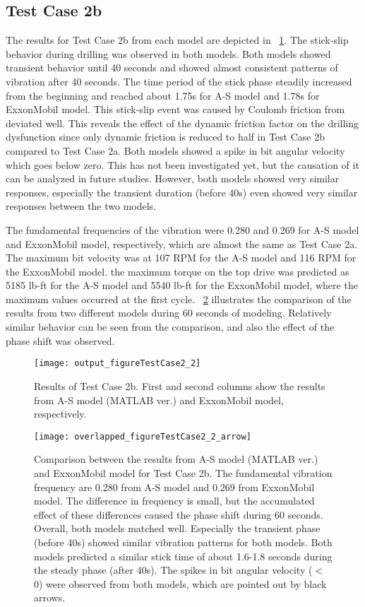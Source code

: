 \subsection{Test Case 2b}
The results for Test Case 2b from each model are depicted in \figurename~\ref{figure_testcase2_2}. The stick-slip behavior during drilling was observed in both models. Both models showed transient behavior until 40 seconds and showed almost consistent patterns of vibration after 40 seconds. The time period of the stick phase steadily increased from the beginning and reached about 1.75s for A-S model and 1.78s for ExxonMobil model. This stick-slip event was caused by Coulomb friction from deviated well. This reveals the effect of the dynamic friction factor on the drilling dysfunction since only dynamic friction is reduced to half in Test Case 2b compared to Test Case 2a. Both models showed a spike in bit angular velocity which goes below zero. This has not been investigated yet, but the causation of it can be analyzed in future studies. However, both models showed very similar responses, especially the transient duration (before 40s) even showed very similar responses between the two models.

The fundamental frequencies of the vibration were 0.280 and 0.269 for A-S model and ExxonMobil model, respectively, which are almost the same as Test Case 2a. The maximum bit velocity was at 107 RPM for the A-S model and 116 RPM for the ExxonMobil model. the maximum torque on the top drive was predicted as 5185 lb-ft for the A-S model and 5540 lb-ft for the ExxonMobil model, where the maximum values occurred at the first cycle. \figurename~\ref{figure_testcase2_2_overlapped} illustrates the comparison of the results from two different models during 60 seconds of modeling. Relatively similar behavior can be seen from the comparison, and also the effect of the phase shift was observed.

\begin{figure}
  \centering
  \texttt{[image: output\_figureTestCase2\_2]}
  \caption[Results of Test Case 2b]{Results of Test Case 2b. First and second columns show the results from A-S model (MATLAB ver.) and ExxonMobil model, respectively.}\label{figure_testcase2_2}
\end{figure}

\begin{figure}
  \centering
  \texttt{[image: overlapped\_figureTestCase2\_2\_arrow]}
  \caption[Comparison of the results for Test Case 2b]{Comparison between the results from A-S model (MATLAB ver.) and ExxonMobil model for Test Case 2b. The fundamental vibration frequency are 0.280 from A-S model and 0.269 from ExxonMobil model. The difference in frequency is small, but the accumulated effect of these differences caused the phase shift during 60 seconds. Overall, both models matched well. Especially the transient phase (before 40s) showed similar vibration patterns for both models. Both models predicted a similar stick time of about 1.6-1.8 seconds during the steady phase (after 40s). The spikes in bit angular velocity ($<$ 0) were observed from both models, which are pointed out by black arrows.}\label{figure_testcase2_2_overlapped}
\end{figure}

